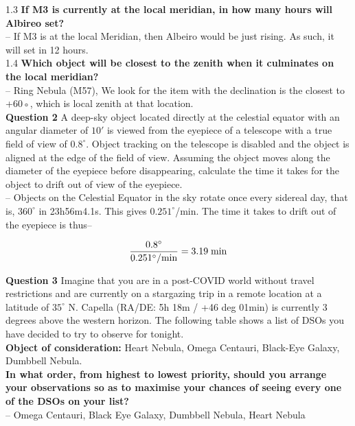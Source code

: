 \documentclass[a4paper,12pt]{extarticle}
\begin{document}
1.3 \textbf{If M3 is currently at the local meridian, in how many hours will Albireo set?}\\
    -- If M3 is at the local Meridian, then Albeiro would be just rising. As such, it will set in 12 hours.\\
    
1.4 \textbf{Which object will be closest to the zenith when it culminates on the local meridian?}\\
    -- Ring Nebula (M57), We look for the item with the declination is the closest to +60◦, which is local zenith at that location.\\
    
\textsf{\textbf{Question 2}} {\color{red} A deep-sky object located directly at the celestial equator with an angular diameter of $10'$ is viewed from the eyepiece of a telescope with a true field of view of $0.8^\circ$. Object tracking on the telescope is disabled and the object is aligned at the edge of the field of view. Assuming the object moves along the diameter of the eyepiece before disappearing, calculate the time it takes for the object to drift out of view of the eyepiece.}\\

    -- Objects on the Celestial Equator in the sky rotate once every sidereal day, that is, $360^\circ$ in 23h56m4.1s. This gives $0.251^\circ$/min. The time it takes to drift out of the eyepiece is thus--
    
    $$\frac{0.8^\circ}{0.251^\circ/\rm min}=3.19\; \rm min$$
    
\textsf{\textbf{Question 3}} {\color{red} Imagine that you are in a post-COVID world without travel restrictions and are currently on a stargazing trip in a remote location at a latitude of $35^\circ$ N. Capella (RA/DE: 5h 18m / +46 deg 01min) is currently 3 degrees above the western horizon. The following table shows a list of DSOs you have decided to try to observe for tonight.} \\

\textbf{Object of consideration:} Heart Nebula, Omega Centauri, Black-Eye Galaxy, Dumbbell Nebula. \\

\textbf{In what order, from highest to lowest priority, should you arrange your observations so as to maximise your chances of seeing every one of the DSOs on your list?}\\
    -- Omega Centauri, Black Eye Galaxy, Dumbbell Nebula, Heart Nebula\\
    
\end{document}
